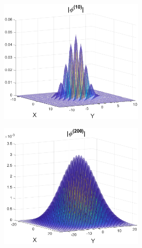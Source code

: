 \documentclass{beamer}
\theoremstyle{definition}
\begin{document}
\begin{frame}
\begin{figure}
\begin{subfigure}{0.49\textwidth}
		\includegraphics[width=0.8\textwidth]{convolve_11.eps}
	\end{subfigure}
	\begin{subfigure}{0.49\textwidth}
		\centering
		\includegraphics[width=0.8\textwidth]{convolve_22.eps}
	\end{subfigure}
\end{figure}


\end{frame}
\end{document}
